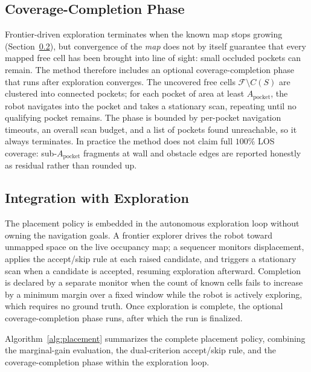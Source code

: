 \documentclass[sensors,article,submit,pdftex,moreauthors]{Definitions/mdpi}
\begin{document}
\subsection{Coverage-Completion Phase}

Frontier-driven exploration terminates when the known map stops growing
(Section~\ref{sec:integration}), but convergence of the \emph{map} does not by
itself guarantee that every mapped free cell has been brought into line of
sight: small occluded pockets can remain. The method therefore includes an
optional coverage-completion phase that runs after exploration converges. The
uncovered free cells $\mathcal{F}\setminus C(S)$ are clustered into connected
pockets; for each pocket of area at least $A_{\mathrm{pocket}}$, the robot
navigates into the pocket and takes a stationary scan, repeating until no
qualifying pocket remains. The phase is bounded by per-pocket navigation
timeouts, an overall scan budget, and a list of pockets found unreachable, so it
always terminates. In practice the method does not claim full $100\%$ LOS
coverage: sub-$A_{\mathrm{pocket}}$ fragments at wall and obstacle edges are
reported honestly as residual rather than rounded up.

\subsection{Integration with Exploration}
\label{sec:integration}

The placement policy is embedded in the autonomous exploration loop without
owning the navigation goals. A frontier explorer drives the robot toward
unmapped space on the live occupancy map; a sequencer monitors displacement,
applies the accept/skip rule at each raised candidate, and triggers a stationary
scan when a candidate is accepted, resuming exploration afterward. Completion is
declared by a separate monitor when the count of known cells fails to increase by
a minimum margin over a fixed window while the robot is actively exploring, which
requires no ground truth. Once exploration is complete, the optional
coverage-completion phase runs, after which the run is finalized.

Algorithm~\ref{alg:placement} summarizes the complete placement policy, combining
the marginal-gain evaluation, the dual-criterion accept/skip rule, and the
coverage-completion phase within the exploration loop.
\end{document}
